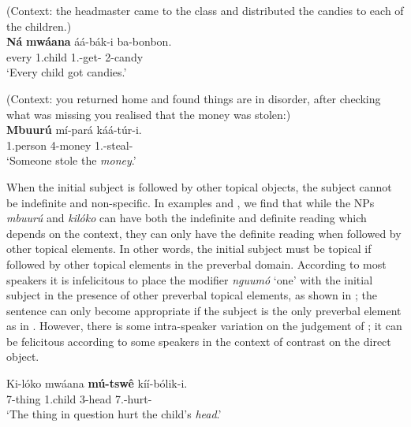 \documentclass[output=paper,colorlinks,citecolor=brown,
]{langscibook}
\begin{document}
\begin{exe} 
\ex
\label{93}
 (Context: the headmaster came to the class and distributed the candies to each of the children.) \\
\gll
\textbf{Ná} \textbf{mwáana} áá-bák-i ba-bonbon.\\
every 1.child 1\Sm{}.\Pst{}-get-\Pst{} 2-candy\\
\trans ‘Every child got candies.’ 

\end{exe}
\begin{exe}
\ex
\label{94}
 (Context: you returned home and found things are in disorder, after checking what was missing you realised that the money was stolen:) \\
\gll
\textbf{Mbuurú} mí-pará káá-túr-i.\\
1.person 4-money 1\Sm{}.\Pst{}-steal-\Pst{}\\
\trans ‘Someone stole the \textit{money}.’ 

\end{exe}
When the initial subject is followed by other topical objects, the subject cannot be indefinite and non-specific. In examples  and , we find that while the NPs \textit{mbuurú} and \textit{kilóko} can have both the indefinite and definite reading which depends on the context, they can only have the definite reading when followed by other topical elements. In other words, the initial subject must be topical if followed by other topical elements in the preverbal domain. According to most speakers it is infelicitous to place the modifier \textit{nguumó} `one' with the initial subject in the presence of other preverbal topical elements, as shown in ; the sentence can only become appropriate if the subject is the only preverbal element as in . However, there is some intra-speaker variation on the judgement of ; it can be felicitous according to some speakers in the context of contrast on the direct object. 
\begin{exe}
\ex
\label{95}
\gll
Ki-lóko mwáana \textbf{mú-tswê} kíí-bólik-i.\\
7-thing 1.child 3-head 7\Sm{}.\Pst{}-hurt-\Pst{}\\
\trans ‘The thing in question hurt the child's \textit{head}.’

\end{exe}
\end{document}
